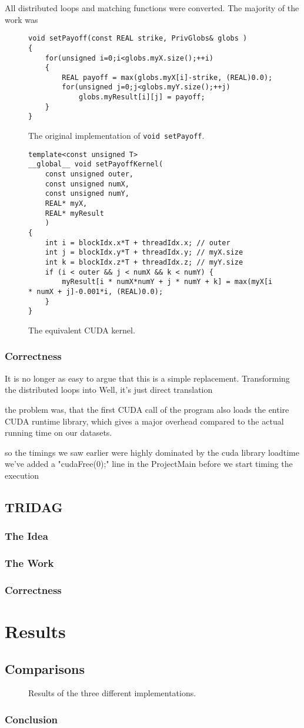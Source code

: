 \documentclass[]{report}
\begin{document}
All distributed loops and matching functions were converted. The majority of the work was 
 \begin{figure}[h]
	\begin{lstlisting}
void setPayoff(const REAL strike, PrivGlobs& globs )
{
	for(unsigned i=0;i<globs.myX.size();++i)
	{
		REAL payoff = max(globs.myX[i]-strike, (REAL)0.0);
		for(unsigned j=0;j<globs.myY.size();++j)
			globs.myResult[i][j] = payoff;
	}
}
	\end{lstlisting}
	\caption{ \label{fig:nokernel} The original implementation of \texttt{void setPayoff}.}
\end{figure}
\begin{figure}[h]
	\begin{lstlisting}
template<const unsigned T>
__global__ void setPayoffKernel(
	const unsigned outer,
	const unsigned numX,
	const unsigned numY,
	REAL* myX,
	REAL* myResult
	)
{
	int i = blockIdx.x*T + threadIdx.x; // outer
	int j = blockIdx.y*T + threadIdx.y; // myX.size
	int k = blockIdx.z*T + threadIdx.z; // myY.size
	if (i < outer && j < numX && k < numY) {
		myResult[i * numX*numY + j * numY + k] = max(myX[i * numX + j]-0.001*i, (REAL)0.0);
	}
}
	\end{lstlisting}
	\caption{ \label{fig:yeskernel} The equivalent CUDA kernel.}
\end{figure}

\subsubsection{Correctness}
It is no longer as easy to argue that this is a simple replacement. Transforming the distributed loops into Well, it's just direct translation

the problem was, that the first CUDA call of the program also loads the entire CUDA runtime library, which gives a major overhead compared to the actual running time on our datasets.

so the timings we saw earlier were highly dominated by the cuda library loadtime
we've added a "cudaFree(0);" line in the ProjectMain before we start timing the execution
\subsection{TRIDAG}
\subsubsection{The Idea}
\subsubsection{The Work}
\subsubsection{Correctness}

\section{Results}
\subsection{Comparisons}
\begin{figure}[h]
\caption{\label{fig:results} Results of the three different implementations.}
\end{figure}
\subsubsection{Conclusion}
\end{document}
